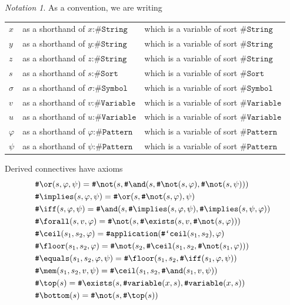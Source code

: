 \documentclass[UTF8,11pt]{article}
\newcounter{thmcounter}
\theoremstyle{plain}
\theoremstyle{definition}
\theoremstyle{remark}
\newtheorem{notation}   [thmcounter]{Notation}
\newcommand{\cln}{\texttt{:}}
\newcommand{\sharpsymbol}{\#}
\newcommand{\KString}{\texttt{\sharpsymbol String}}
\newcommand{\KSort}{\texttt{\sharpsymbol Sort}}
\newcommand{\KSymbol}{\texttt{\sharpsymbol Symbol}}
\newcommand{\KSymbolceil}{\texttt{\sharpsymbol `ceil}}
\newcommand{\KVariable}{\texttt{\sharpsymbol Variable}}
\newcommand{\KPattern}{\texttt{\sharpsymbol Pattern}}
\newcommand{\Kvariable}{\texttt{\sharpsymbol variable}}
\newcommand{\Kand}{\texttt{\sharpsymbol  \slashsymbol and}}
\newcommand{\Kor}{\texttt{\sharpsymbol \slashsymbol  or}}
\newcommand{\Kimplies}{\texttt{\sharpsymbol  \slashsymbol implies}}
\newcommand{\Kiff}{\texttt{\sharpsymbol  \slashsymbol iff}}
\newcommand{\Knot}{\texttt{\sharpsymbol  \slashsymbol not}}
\newcommand{\Kapplication}{\texttt{\sharpsymbol application}}
\newcommand{\Kexists}{\texttt{\sharpsymbol \slashsymbol  exists}}
\newcommand{\Kforall}{\texttt{\sharpsymbol \slashsymbol  forall}}
\newcommand{\Kequals}{\texttt{\sharpsymbol \slashsymbol  equals}}
\newcommand{\Kmembership}{\texttt{\sharpsymbol \slashsymbol  mem}}
\newcommand{\Ktop}{\texttt{\sharpsymbol \slashsymbol  top}}
\newcommand{\Kbottom}{\texttt{\sharpsymbol \slashsymbol  bottom}}
\newcommand{\Kfloor}{\texttt{\sharpsymbol \slashsymbol  floor}}
\newcommand{\Kceil}{\texttt{\sharpsymbol \slashsymbol  ceil}}
\newcommand{\slashsymbol}{\symbol{92}}
\begin{document}
\begin{notation}\label{notation:variables-about-KPattern}
	As a convention, we are writing
	\begin{center}
	\begin{tabular}{lll}
		$x$ & as a shorthand of $x \cln \KString$ 
		& which is a variable of sort $\KString$
		\\
		$y$ & as a shorthand of $y \cln \KString$ 
		& which is a variable of sort $\KString$
		\\
		$z$ & as a shorthand of $z \cln \KString$ 
		& which is a variable of sort $\KString$
		\\
		$s$ & as a shorthand of $s \cln \KSort$ 
		& which is a variable of sort $\KSort$
		\\
		$\sigma$ & as a shorthand of $\sigma \cln \KSymbol$ 
		& which is a variable of sort $\KSymbol$
		\\
		$v$ & as a shorthand of $v \cln \KVariable$ 
		& which is a variable of sort $\KVariable$
		\\
		$u$ & as a shorthand of $u \cln \KVariable$ 
		& which is a variable of sort $\KVariable$
		\\
		$\varphi$ & as a shorthand of $\varphi \cln \KPattern$ 
		& which is a variable of sort $\KPattern$
		\\
		$\psi$ & as a shorthand of $\psi \cln \KPattern$ 
		& which is a variable of sort $\KPattern$
	\end{tabular}
	\end{center} 
\end{notation}

Derived connectives have axioms
\begin{align*}
  & \Kor(s, \varphi, \psi) 
  = \Knot(s, \Kand(s, \Knot(s, \varphi), \Knot(s, \psi)))
  \\
  & \Kimplies(s, \varphi, \psi) 
  = \Kor(s, \Knot(s, \varphi), \psi)
  \\
  & \Kiff(s, \varphi, \psi) 
  = \Kand(s, \Kimplies(s, \varphi, \psi), \Kimplies(s, \psi, \varphi))
  \\
  & \Kforall(s, v, \varphi) 
  = \Knot(s, \Kexists(s, v, \Knot(s, \varphi)))
  \\
  & \Kceil(s_1, s_2, \varphi) =
    \Kapplication(\KSymbolceil(s_1, s_2), \varphi)
  \\
  & \Kfloor(s_1, s_2, \varphi) 
  = \Knot(s_2, \Kceil(s_1, s_2, \Knot(s_1, \varphi)))
  \\
  & \Kequals(s_1, s_2, \varphi, \psi) 
  = \Kfloor(s_1, s_2, \Kiff(s_1, \varphi, \psi))
  \\
  & \Kmembership(s_1, s_2, v, \psi) 
  = \Kceil(s_1, s_2, \Kand(s_1, v, \psi))
  \\
  & \Ktop(s) = \Kexists(s, \Kvariable(x, s), \Kvariable(x, s))
  \\
  & \Kbottom(s) = \Knot(s, \Ktop(s))
\end{align*}
\end{document}
